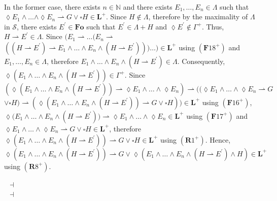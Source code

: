 \documentclass[draft]{article}
\newenvironment{proof}{{\bf Proof:}}{~$\dashv$\\}
\def\N{\mathbb{N}}
\def\Formula{\mathbf{A}}
\def\Formula{\mathbf{F}}
\def\Rule{\mathbf{R}}
\def\Fo{\mathbf{Fo}}
\def\L{\mathbf{L}}
\begin{document}
\begin{proof}
\begin{proof}
\\
%
%
In the former case, there exists $n{\in}\N$ and there exists $E_{1},\ldots,E_{n}{\in}\Lambda$ such that ${\lozenge}E_{1}{\wedge}\ldots
%
%
%
%
%
%
%
$\linebreak$
%
%
%
%
%
%
{\wedge}{\lozenge}E_{n}{\rightharpoonup}G{\vee}{\square}H{\in}\L^{+}$.
Since $H{\not\in}\Lambda$, therefore by the maximality of $\Lambda$ in ${\mathcal S}$, there exists $E^{\prime}{\in}\Fo$ such that $E^{\prime}{\in}\Lambda{+}H$ and ${\lozenge}E^{\prime}{\not\in}\Gamma^{+}$.
Thus, $H{\rightharpoonup}E^{\prime}{\in}\Lambda$.
Since $(E_{1}{\rightharpoonup}\ldots(E_{n}{\rightharpoonup}
%
%
%
%
%
%
%
$\linebreak$
%
%
%
%
%
%
((H{\rightharpoonup}E^{\prime}){\rightharpoonup}E_{1}{\wedge}\ldots{\wedge}E_{n}{\wedge}(H{\rightharpoonup}E^{\prime})))\ldots){\in}\L^{+}$ using $(\Formula18^{+})$ and $E_{1},\ldots,E_{n}{\in}\Lambda$,
%
%
%
%
%
%
%
\linebreak
%
%
%
%
%
%
therefore $E_{1}{\wedge}\ldots{\wedge}E_{n}{\wedge}(H{\rightharpoonup}E^{\prime}){\in}\Lambda$.
Consequently, ${\lozenge}(E_{1}{\wedge}\ldots{\wedge}E_{n}{\wedge}(H{\rightharpoonup}E^{\prime})){\in}
%
%
%
%
%
%
%
$\linebreak$
%
%
%
%
%
%
\Gamma^{+}$.
Since $({\lozenge}(E_{1}{\wedge}\ldots{\wedge}E_{n}{\wedge}(H{\rightharpoonup}E^{\prime})){\rightharpoonup}{\lozenge}E_{1}{\wedge}\ldots{\wedge}{\lozenge}E_{n}){\rightharpoonup}(({\lozenge}E_{1}{\wedge}\ldots{\wedge}{\lozenge}E_{n}{\rightharpoonup}G
%
%
%
%
%
%
%
$\linebreak$
%
%
%
%
%
%
{\vee}{\square}H){\rightharpoonup}({\lozenge}(E_{1}{\wedge}\ldots{\wedge}E_{n}{\wedge}(H{\rightharpoonup}E^{\prime})){\rightharpoonup}G{\vee}{\square}H)){\in}\L^{+}$ using $(\Formula16^{+})$, ${\lozenge}(E_{1}{\wedge}\ldots{\wedge}
%
%
%
%
%
%
%
$\linebreak$
%
%
%
%
%
%
E_{n}{\wedge}(H{\rightharpoonup}E^{\prime})){\rightharpoonup}{\lozenge}E_{1}{\wedge}\ldots{\wedge}{\lozenge}E_{n}{\in}\L^{+}$ using $(\Formula17^{+})$ and ${\lozenge}E_{1}{\wedge}\ldots{\wedge}{\lozenge}E_{n}{\rightharpoonup}G{\vee}{\square}H
%
%
%
%
%
%
%
$\linebreak$
%
%
%
%
%
%
{\in}\L^{+}$, therefore ${\lozenge}(E_{1}{\wedge}\ldots{\wedge}E_{n}{\wedge}(H{\rightharpoonup}E^{\prime})){\rightharpoonup}G{\vee}{\square}H{\in}\L^{+}$ using $(\Rule1^{+})$.
Hence,
%
%
%
%
%
%
%
\linebreak$
%
%
%
%
%
%
{\lozenge}(E_{1}{\wedge}\ldots{\wedge}E_{n}{\wedge}(H{\rightharpoonup}E^{\prime})){\rightharpoonup}G{\vee}{\lozenge}(E_{1}{\wedge}\ldots{\wedge}E_{n}{\wedge}(H{\rightharpoonup}E^{\prime}){\wedge}H){\in}\L^{+}$ using $(\Rule8^{+})$.

\end{proof}
\end{proof}
\end{document}
